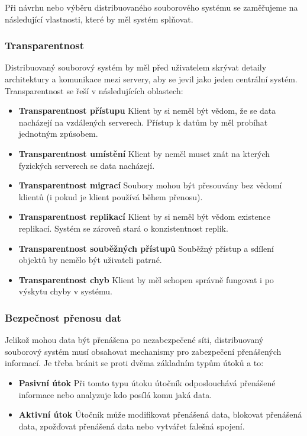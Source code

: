 \documentclass[czech,DP]{thesiskiv}
\begin{document}
Při návrhu nebo výběru distribuovaného souborového systému se zaměřujeme na následující vlastnosti, které by měl systém splňovat.
\subsubsection*{Transparentnost}

Distribuovaný souborový systém by měl před uživatelem skrývat detaily architektury a komunikace mezi servery, aby se jevil jako jeden centrální systém. Transparentnost se řeší v následujících oblastech:

\begin{itemize}
\item \textbf{Transparentnost přístupu} Klient by si neměl být vědom, že se data nacházejí na vzdálených serverech. Přístup k datům by měl probíhat jednotným způsobem.
\item \textbf{Transparentnost umístění} Klient by neměl muset znát na kterých fyzických serverech se data nacházejí.
\item \textbf{Transparentnost migrací} Soubory mohou být přesouvány bez vědomí klientů (i pokud je klient používá během přenosu).
\item \textbf{Transparentnost replikací} Klient by si neměl být vědom existence replikací. Systém se zároveň stará o konzistentnost replik.
\item \textbf{Transparentnost souběžných přístupů} Souběžný přístup a sdílení objektů by nemělo být uživateli patrné.
\item \textbf{Transparentnost chyb} Klient by měl schopen správně fungovat i po výskytu chyby v systému.

\end{itemize}

\subsubsection*{Bezpečnost přenosu dat}

Jelikož mohou data být přenášena po nezabezpečené síti, distribuovaný souborový systém musí obsahovat mechanismy pro zabezpečení přenášených informací. Je třeba bránit se proti dvěma základním typům útoků a to:

\begin{itemize}

\item \textbf{Pasivní útok} Při tomto typu útoku útočník odposlouchává přenášené informace nebo analyzuje kdo posílá komu jaká data.
\item \textbf{Aktivní útok} Útočník může modifikovat přenášená data, blokovat přenášená data, zpožďovat přenášená data nebo vytvářet falešná spojení.

\end{itemize}
\end{document}
